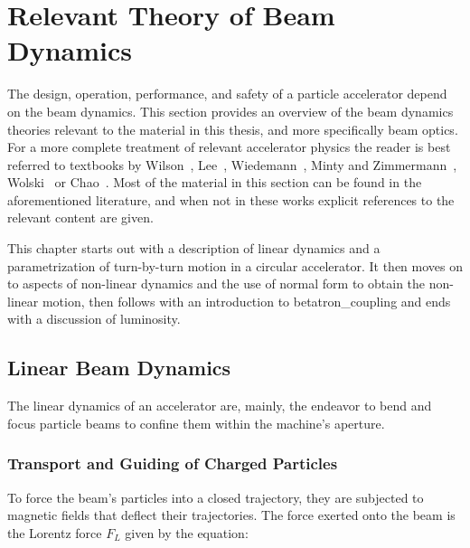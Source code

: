 \chapter{Relevant Theory of Beam Dynamics}
\label{chapter:theory}

The design, operation, performance, and safety of a particle accelerator depend on the \gls{beam} dynamics.
This section provides an overview of the beam dynamics theories relevant to the material in this thesis, and more specifically beam \gls{optics}.
For a more complete treatment of relevant accelerator physics the reader is best referred to textbooks by Wilson~\cite{BOOK:Wilson:Introcution_Particle_Accelerators}, Lee~\cite{BOOK:Lee:Accelerator_physics}, Wiedemann~\cite{BOOK:Wiedemann:Particle_Accelerator_Physics}, Minty and Zimmermann~\cite{BOOK:Minty:Measurements_Control_Charged_Particle_Beams}, Wolski~\cite{BOOK:Wolski:Beam_dynamics} or Chao~\cite{BOOK:Chao:Handbook_Accelerator_Physics_Engineering, BOOK:Chao:Collective_instabilities}.
Most of the material in this section can be found in the aforementioned literature, and when not in these works explicit references to the relevant content are given.

This chapter starts out with a description of linear dynamics and a parametrization of turn-by-turn motion in a circular accelerator.
It then moves on to aspects of non-linear dynamics and the use of normal form to obtain the non-linear motion, then follows with an introduction to \gls{betatron_coupling} and ends with a discussion of \gls{luminosity}.


\section{Linear Beam Dynamics}
\label{section:linear_beam_dynamics}

The linear dynamics of an accelerator are, mainly, the endeavor to bend and focus particle \glspl{beam} to confine them within the machine's aperture.

\subsection{Transport and Guiding of Charged Particles}
\label{subsection:transport_and_guiding_of_charged_particles}

To force the beam's particles into a closed trajectory, they are subjected to magnetic fields that deflect their trajectories.
The force exerted onto the beam is the Lorentz force \(F_{L}\) given by the equation:

